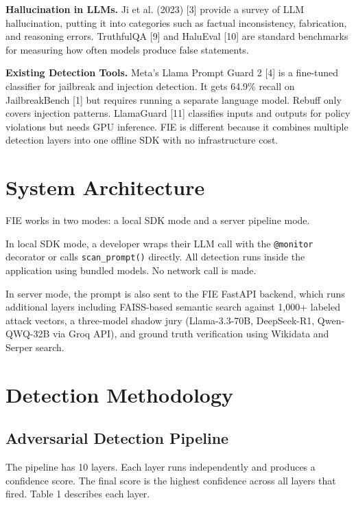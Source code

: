 \documentclass[12pt,a4paper]{article}
\begin{document}
\textbf{Hallucination in LLMs.}
Ji et al. (2023) [3] provide a survey of LLM hallucination, putting it into
categories such as factual inconsistency, fabrication, and reasoning errors.
TruthfulQA [9] and HaluEval [10] are standard benchmarks for measuring how
often models produce false statements.

\textbf{Existing Detection Tools.}
Meta's Llama Prompt Guard 2 [4] is a fine-tuned classifier for jailbreak and
injection detection. It gets 64.9\% recall on JailbreakBench [1] but requires
running a separate language model. Rebuff only covers injection patterns.
LlamaGuard [11] classifies inputs and outputs for policy violations but needs
GPU inference. FIE is different because it combines multiple detection layers
into one offline SDK with no infrastructure cost.

\section{System Architecture}

FIE works in two modes: a local SDK mode and a server pipeline mode.

In local SDK mode, a developer wraps their LLM call with the \texttt{@monitor}
decorator or calls \texttt{scan\_prompt()} directly. All detection runs inside
the application using bundled models. No network call is made.

In server mode, the prompt is also sent to the FIE FastAPI backend, which runs
additional layers including FAISS-based semantic search against 1,000+ labeled
attack vectors, a three-model shadow jury (Llama-3.3-70B, DeepSeek-R1,
Qwen-QWQ-32B via Groq API), and ground truth verification using Wikidata
and Serper search.

\section{Detection Methodology}

\subsection{Adversarial Detection Pipeline}

The pipeline has 10 layers. Each layer runs independently and produces a
confidence score. The final score is the highest confidence across all layers
that fired. Table 1 describes each layer.
\end{document}
